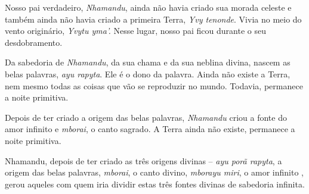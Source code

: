 

Nosso pai verdadeiro, \emph{Nhamandu}, ainda não havia criado sua morada
celeste e também ainda não havia criado a primeira Terra, \emph{Yvy
tenonde}. Vivia no meio do vento originário, \emph{Yvytu yma'.} Nesse
lugar, nosso pai ficou durante o seu desdobramento.

Da sabedoria de \emph{Nhamandu}, da sua chama e da sua neblina divina,
nascem as belas palavras, \emph{ayu rapyta}. Ele é o dono da palavra.
Ainda não existe a Terra, nem mesmo todas as coisas que vão se
reproduzir no mundo. Todavia, permanece a noite primitiva.

Depois de ter criado a origem das belas palavras, \emph{Nhamandu} criou
a fonte do amor infinito e \emph{mborai}, o canto sagrado. A Terra ainda
não existe, permanece a noite primitiva.

Nhamandu, depois de ter criado as três origens divinas -- \emph{ayu porã
rapyta}, a origem das belas palavras, \emph{mborai}, o canto divino,
\emph{mborayu miri}, o amor infinito , gerou aqueles com quem iria
dividir estas três fontes divinas de sabedoria infinita.
